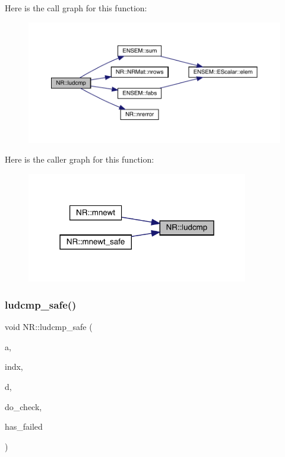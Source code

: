 Here is the call graph for this function\+:
\nopagebreak
\begin{figure}[H]
\begin{center}
\leavevmode
\includegraphics[width=350pt]{da/d46/namespaceNR_a71e8f8aa20cd167f6379653f60ccaa1a_cgraph}
\end{center}
\end{figure}
Here is the caller graph for this function\+:
\nopagebreak
\begin{figure}[H]
\begin{center}
\leavevmode
\includegraphics[width=274pt]{da/d46/namespaceNR_a71e8f8aa20cd167f6379653f60ccaa1a_icgraph}
\end{center}
\end{figure}
\mbox{\label{namespaceNR_a03fd0ba9f0721c1fe3355bd81704727d}} 
\subsubsection{\texorpdfstring{ludcmp\_safe()}{ludcmp\_safe()}}
{\footnotesize\ttfamily void N\+R\+::ludcmp\+\_\+safe (\begin{DoxyParamCaption}\item[{\mbox{\hyperlink{namespaceNR_ad1513aa4697878ed3bff0b8b3c9dd910}{Mat\+\_\+\+I\+O\+\_\+\+DP}} \&}]{a,  }\item[{\mbox{\hyperlink{namespaceNR_ade2338f6d53b7da3dd6d1c04804541f2}{Vec\+\_\+\+O\+\_\+\+I\+NT}} \&}]{indx,  }\item[{\mbox{\hyperlink{namespaceNR_af6ff762dd605ff477b8e52387253a02a}{DP}} \&}]{d,  }\item[{const bool}]{do\+\_\+check,  }\item[{bool \&}]{has\+\_\+failed }\end{DoxyParamCaption})}

